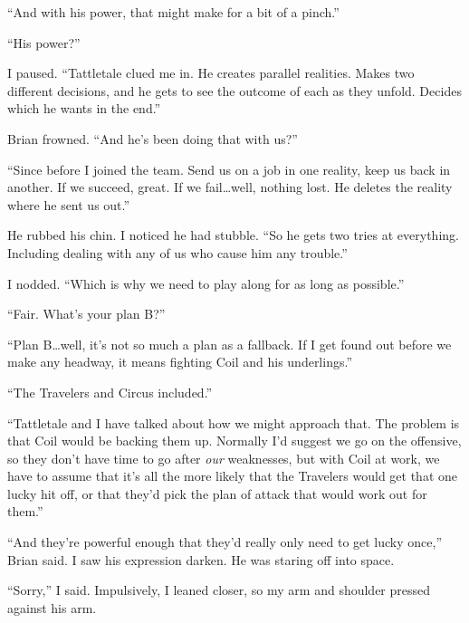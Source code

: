 ``And with his power, that might make for a bit of a pinch.''



``His power?''



I paused.  ``Tattletale clued me in.  He creates parallel realities.  Makes two different decisions, and he gets to see the outcome of each as they unfold.  Decides which he wants in the end.''



Brian frowned.  ``And he's been doing that with us?''



``Since before I joined the team.  Send us on a job in one reality, keep us back in another.  If we succeed, great.  If we fail\ldots well, nothing lost.  He deletes the reality where he sent us out.''



He rubbed his chin.  I noticed he had stubble.  ``So he gets two tries at everything.  Including dealing with any of us who cause him any trouble.''



I nodded.  ``Which is why we need to play along for as long as possible.''



``Fair.  What's your plan B?''



``Plan B\ldots well, it's not so much a plan as a fallback.  If I get found out before we make any headway, it means fighting Coil and his underlings.''



``The Travelers and Circus included.''



``Tattletale and I have talked about how we might approach that.  The problem is that Coil would be backing them up.  Normally I'd suggest we go on the offensive, so they don't have time to go after \emph{our} weaknesses, but with Coil at work, we have to assume that it's all the more likely that the Travelers would get that one lucky hit off, or that they'd pick the plan of attack that would work out for them.''



``And they're powerful enough that they'd really only need to get lucky once,'' Brian said.  I saw his expression darken.  He was staring off into space.



``Sorry,'' I said.  Impulsively, I leaned closer, so my arm and shoulder pressed against his arm.



